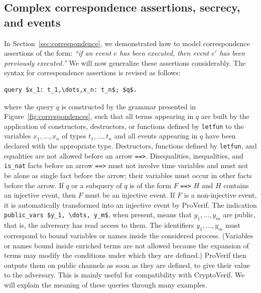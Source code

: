 \documentclass{book}
\begin{document}
\subsection{Complex correspondence assertions, secrecy, and events}
\label{sec:complexcorresp}

In Section~\ref{sec:correspondence}, we demonstrated how to model correspondence assertions of the form: \emph{``if an event $e$ has been executed, then event $e'$ has been previously executed.''} We will now generalize these assertions considerably. The syntax for correspondence assertions is revised as follows:
%
\begin{lstlisting}[numbers=none]
	query $x_1: t_1,\dots,x_n: t_n$; $q$.
\end{lstlisting}
%
where the query $q$ is constructed by the grammar presented in Figure~\ref{fig:correspondences},
such that all terms appearing in $q$ are built by the application of constructors, destructors, or functions defined by \lstinline!letfun! to the variables $x_1,\ldots,x_n$ of types $t_1,\ldots,t_n$ and all events appearing in $q$ have been declared with the appropriate type.
Destructors, functions defined by \lstinline!letfun!, and equalities are not allowed before an arrow \lstinline!==>!.
Disequalities, inequalities, and \lstinline!is_nat! facts before an arrow \lstinline!==>! must not involve time variables and must not be alone as single fact before the arrow; their variables must occur in other facts before the arrow.
If $q$ or a subquery of $q$ is of the form $F$ \lstinline!==>! $H$ and $H$ contains an injective event, then $F$ must be an injective event. If $F$ is a non-injective event, it is automatically transformed into an injective event by ProVerif.
The indication \lstinline!public_vars $y_1, \dots, y_m$!, when present, means that $y_1, \dots, y_m$ are public, that is, the adversary has read access to them. The identifiers $y_1, \dots, y_m$ must correspond to bound variables or names inside the considered process. (Variables or names bound inside enriched terms are not allowed because the expansion of terms may modify the conditions under which they are defined.) ProVerif then outputs them on public channels as soon as they are defined, to give their value to the adversary. This is mainly useful for compatibility with CryptoVerif.
%
We will explain the meaning of these queries through many examples.
\end{document}
